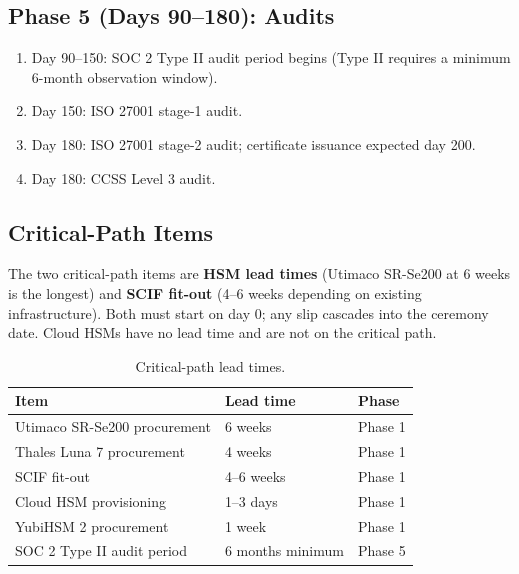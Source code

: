 \subsection{Phase 5 (Days 90--180): Audits}

\begin{enumerate}[nosep]
\item Day 90--150: SOC 2 Type II audit period begins (Type II
requires a minimum 6-month observation window).
\item Day 150: ISO 27001 stage-1 audit.
\item Day 180: ISO 27001 stage-2 audit; certificate issuance
expected day 200.
\item Day 180: CCSS Level 3 audit.
\end{enumerate}

\subsection{Critical-Path Items}

The two critical-path items are \textbf{HSM lead times} (Utimaco
SR-Se200 at 6 weeks is the longest) and \textbf{SCIF fit-out} (4--6
weeks depending on existing infrastructure). Both must start on day
0; any slip cascades into the ceremony date. Cloud HSMs have no
lead time and are not on the critical path.

\begin{table}[h]
\centering
\small
\begin{tabular}{lll}
\toprule
\textbf{Item} & \textbf{Lead time} & \textbf{Phase} \\
\midrule
Utimaco SR-Se200 procurement & 6 weeks & Phase 1 \\
Thales Luna 7 procurement & 4 weeks & Phase 1 \\
SCIF fit-out & 4--6 weeks & Phase 1 \\
Cloud HSM provisioning & 1--3 days & Phase 1 \\
YubiHSM 2 procurement & 1 week & Phase 1 \\
SOC 2 Type II audit period & 6 months minimum & Phase 5 \\
\bottomrule
\end{tabular}
\caption{Critical-path lead times.}
\label{tab:lead-times}
\end{table}

